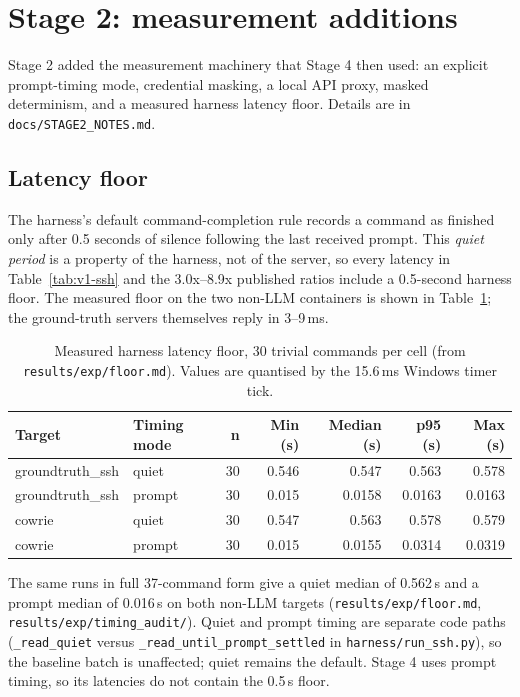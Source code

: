\documentclass[a4paper,11pt]{article}
\begin{document}
\section{Stage 2: measurement additions}

Stage 2 added the measurement machinery that Stage 4 then used: an explicit
prompt-timing mode, credential masking, a local API proxy, masked determinism,
and a measured harness latency floor. Details are in
\texttt{docs/STAGE2\_NOTES.md}.

\subsection{Latency floor}
\label{sec:floor}

The harness's default command-completion rule records a command as finished
only after 0.5 seconds of silence following the last received prompt. This
\emph{quiet period} is a property of the harness, not of the server, so every
latency in Table~\ref{tab:v1-ssh} and the 3.0x--8.9x published ratios include a
0.5-second harness floor. The measured floor on the two non-LLM containers is
shown in Table~\ref{tab:floor}; the ground-truth servers themselves reply in
3--9\,ms.

\begin{table}[ht]
\centering
\caption{Measured harness latency floor, 30 trivial commands per cell (from
\texttt{results/exp/floor.md}). Values are quantised by the 15.6\,ms Windows
timer tick.}
\label{tab:floor}
\scriptsize
\begin{tabularx}{\textwidth}{l l r r r r r}
\toprule
Target & Timing mode & n & Min (s) & Median (s) & p95 (s) & Max (s) \\
\midrule
groundtruth\_ssh & quiet & 30 & 0.546 & 0.547 & 0.563 & 0.578 \\
groundtruth\_ssh & prompt & 30 & 0.015 & 0.0158 & 0.0163 & 0.0163 \\
cowrie & quiet & 30 & 0.547 & 0.563 & 0.578 & 0.579 \\
cowrie & prompt & 30 & 0.015 & 0.0155 & 0.0314 & 0.0319 \\
\bottomrule
\end{tabularx}
\end{table}

The same runs in full 37-command form give a quiet median of 0.562\,s and a
prompt median of 0.016\,s on both non-LLM targets
(\texttt{results/exp/floor.md}, \texttt{results/exp/timing\_audit/}). Quiet and
prompt timing are separate code paths (\texttt{\_read\_quiet} versus
\texttt{\_read\_until\_prompt\_settled} in \texttt{harness/run\_ssh.py}), so the
baseline batch is unaffected; quiet remains the default. Stage 4 uses prompt
timing, so its latencies do not contain the 0.5\,s floor.
\end{document}
